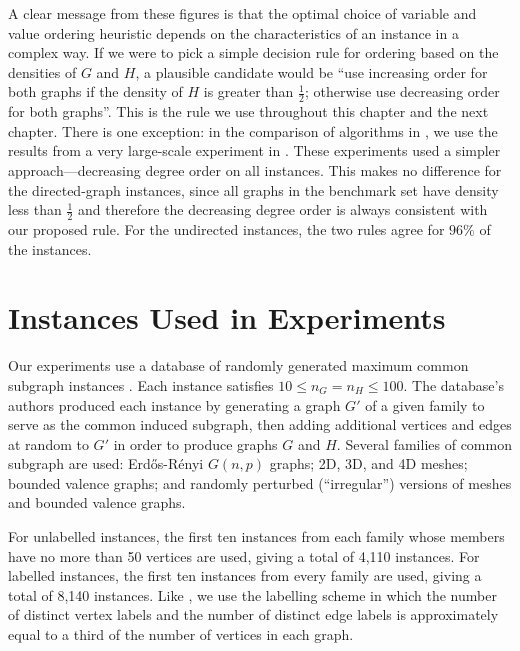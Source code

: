 A clear message from these figures is that the optimal choice of variable and
value ordering heuristic depends on the characteristics of an instance in a
complex way.  If we were to pick a simple decision rule for ordering based on
the densities of $G$ and $H$, a plausible candidate would be ``use increasing
order for both graphs if the density of $H$ is greater than $\frac{1}{2}$;
otherwise use decreasing order for both graphs''.  This is the rule we use
throughout this chapter and the next chapter.  There is one exception: in the
comparison of algorithms in , we use the
results from a very large-scale experiment in
\citet{DBLP:conf/ijcai/McCreeshPT17}.
These experiments used a simpler approach---decreasing
degree order on all instances.
This makes no difference for the directed-graph instances, since
all graphs in the benchmark set have density less than $\frac{1}{2}$
and therefore the decreasing degree order is always consistent with
our proposed rule.
For the undirected instances, the two rules agree for $96\%$ of the
instances.

\FloatBarrier

\section{Instances Used in Experiments}\label{sec:mcis-instances}

Our experiments use a database of randomly generated maximum common subgraph
instances \citep{DBLP:journals/prl/SantoFSV03,DBLP:journals/jgaa/ConteFV07}.
Each instance satisfies $10 \leq n_G = n_H \leq 100$.  The database's authors
produced each instance by generating a graph $G'$ of a given family to serve as
the common induced subgraph, then adding additional vertices and edges at
random to $G'$ in order to produce graphs $G$ and $H$. Several families of
common subgraph are used: Erd\H{o}s-Rényi $G(n,p)$ graphs; 2D, 3D, and 4D meshes;
bounded valence graphs; and randomly perturbed (``irregular'') versions of
meshes and bounded valence graphs.

For unlabelled instances, the
first ten instances from each family whose members have no more than 50
vertices are used, giving a total of 4,110 instances.  For labelled instances,
the first ten instances from every family are used, giving a total of 8,140
instances. Like \citet{DBLP:conf/cp/McCreeshNPS16}, we use the labelling scheme
in which the number of distinct vertex labels and the number of distinct edge
labels is approximately equal to a third of the number of vertices in each
graph.

